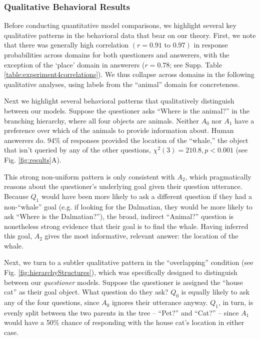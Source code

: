 \documentclass[12pt, floatsintext, jou]{apa6}
\begin{document}
\subsubsection{Qualitative Behavioral Results}

Before conducting quantitative model comparisons, we highlight several key qualitative patterns in the behavioral data that bear on our theory. First, we note that there was generally high correlation $(r = 0.91 \textrm{ to } 0.97)$ in response probabilities across domains for both questioners and answerers, with the exception of the `place' domain in answerers ($r = 0.78$; see Supp. Table \ref{table:experiment4correlations}). We thus collapse across domains in the following qualitative analyses, using labels from the ``animal'' domain for concreteness. 

Next we highlight several behavioral patterns that qualitatively distinguish between our models.
Suppose the questioner asks ``Where is the animal?'' in the branching hierarchy, where all four objects are animals. Neither $A_0$ nor $A_1$ have a preference over which of the animals to provide information about. Human answerers do. 94\% of responses provided the location of the ``whale,'' the object that isn't queried by any of the other questions, $\chi^2(3) = 210.8, p < 0.001$ (see Fig. \ref{fig:results}A).

This strong non-uniform pattern %
is only consistent with $A_2$, which pragmatically reasons about the questioner's underlying goal given their question utterance. Because $Q_1$ would have been more likely to ask a different question if they had a non-``whale'' goal (e.g. if looking for the Dalmatian, they would be more likely to ask ``Where is the Dalmatian?''), the broad, indirect ``Animal?'' question is nonetheless strong evidence that their goal is to find the whale. Having inferred this goal, $A_2$ gives the most informative, relevant answer: the location of the whale.

Next, we turn to a subtler qualitative pattern in the ``overlapping'' condition (see Fig. \ref{fig:hierarchyStructures}), which was specifically designed to distinguish between our \emph{questioner} models. Suppose the questioner is assigned the ``house cat'' as their goal object. What question do they ask? $Q_0$ is equally likely to ask any of the four questions, since $A_0$ ignores their utterance anyway. $Q_1$, in turn, is evenly split between the two parents in the tree -- ``Pet?'' and ``Cat?'' -- since $A_1$ would have a 50\% chance of responding with the house cat's location in either case. 
\end{document}

